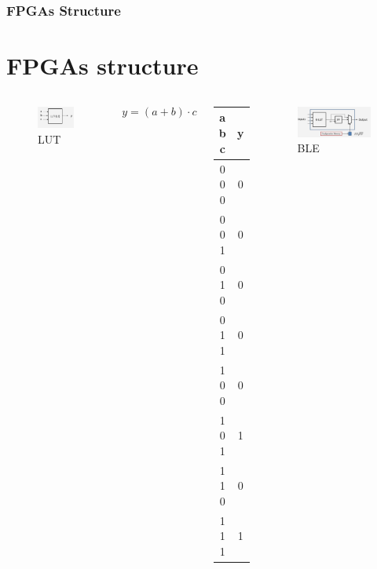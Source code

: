 \documentclass{beamer}
\begin{document}
\begin{frame}
\frametitle{FPGAs Structure}

\section{FPGAs structure}

\begin{columns}[c]

\begin{figure}
\centering
\includegraphics[width=.8\linewidth,right]{lut.jpg}
\caption{ LUT  }
\end{figure}


\vspace*{-\baselineskip}\setlength\belowdisplayshortskip{0pt}
$$y = ( a + b ) \cdot c $$

\begin{table}
\centering
\begin{tabular}{c|c}
a b c & y \\
\hline
0 0 0 & 0\\
0 0 1 & 0\\
0 1 0 & 0\\
0 1 1 & 0\\
1 0 0 & 0\\
1 0 1 & 1\\
1 1 0 & 0\\
1 1 1 & 1\\

\end{tabular}
\end{table}

\centering
\begin{figure}
\includegraphics[width=\linewidth,right]{ble.jpg}
\caption{BLE}
\end{figure}


\end{columns}
\end{frame}
\end{document}
